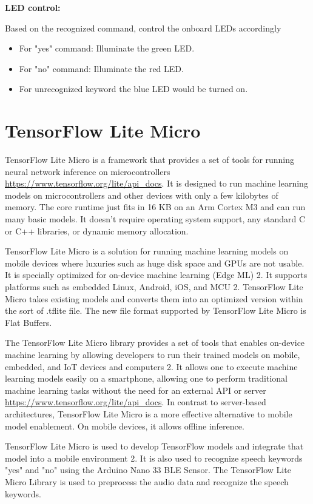 \textbf{LED control:}

Based on the recognized command, control the onboard LEDs accordingly
\begin{itemize}
	\item For "yes" command: Illuminate the green LED.
	\item For "no" command: Illuminate the red LED.
	\item For unrecognized keyword the blue LED would be turned on.
\end{itemize} 

\section{TensorFlow Lite Micro}
TensorFlow Lite Micro is a framework that provides a set of tools for running neural network inference on microcontrollers \url{https://www.tensorflow.org/lite/api_docs}. It is designed to run machine learning models on microcontrollers and other devices with only a few kilobytes of memory. The core runtime just fits in 16 KB on an Arm Cortex M3 and can run many basic models. It doesn’t require operating system support, any standard C or C++ libraries, or dynamic memory allocation.

TensorFlow Lite Micro is a solution for running machine learning models on mobile devices where luxuries such as huge disk space and GPUs are not usable. It is specially optimized for on-device machine learning (Edge ML) 2. It supports platforms such as embedded Linux, Android, iOS, and MCU 2. TensorFlow Lite Micro takes existing models and converts them into an optimized version within the sort of .tflite file. The new file format supported by TensorFlow Lite Micro is Flat Buffers.

The TensorFlow Lite Micro library provides a set of tools that enables on-device machine learning by allowing developers to run their trained models on mobile, embedded, and IoT devices and computers 2. It allows one to execute machine learning models easily on a smartphone, allowing one to perform traditional machine learning tasks without the need for an external API or server \url{https://www.tensorflow.org/lite/api_docs}. In contrast to server-based architectures, TensorFlow Lite Micro is a more effective alternative to mobile model enablement. On mobile devices, it allows offline inference.

TensorFlow Lite Micro is used to develop TensorFlow models and integrate that model into a mobile environment 2. It is also used to recognize speech keywords "yes" and "no" using the Arduino Nano 33 BLE Sensor. The TensorFlow Lite Micro Library is used to preprocess the audio data and recognize the speech keywords.

